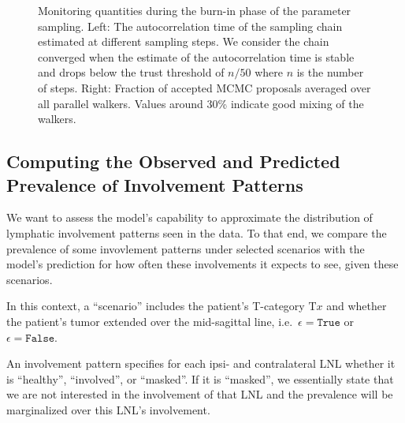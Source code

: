 \documentclass[
  sn-mathphys-num,
]{sn-jnl}
\begin{document}
\begin{figure}


\caption{\label{fig-model-burnin-history}Monitoring quantities during
the burn-in phase of the parameter sampling. Left: The autocorrelation
time of the sampling chain estimated at different sampling steps. We
consider the chain converged when the estimate of the autocorrelation
time is stable and drops below the trust threshold of \(n/50\) where
\(n\) is the number of steps. Right: Fraction of accepted MCMC proposals
averaged over all parallel walkers. Values around 30\% indicate good
mixing of the walkers.}

\end{figure}%

\subsection{Computing the Observed and Predicted Prevalence of
Involvement Patterns}\label{sec-prevalence}

We want to assess the model's capability to approximate the distribution
of lymphatic involvement patterns seen in the data. To that end, we
compare the prevalence of some invovlement patterns under selected
scenarios with the model's prediction for how often these involvements
it expects to see, given these scenarios.

In this context, a ``scenario'' includes the patient's T-category
\(\text{T}x\) and whether the patient's tumor extended over the
mid-sagittal line, i.e.~\(\epsilon=\texttt{True}\) or
\(\epsilon=\texttt{False}\).

An involvement pattern specifies for each ipsi- and contralateral LNL
whether it is ``healthy'', ``involved'', or ``masked''. If it is
``masked'', we essentially state that we are not interested in the
involvement of that LNL and the prevalence will be marginalized over
this LNL's involvement.
\end{document}
